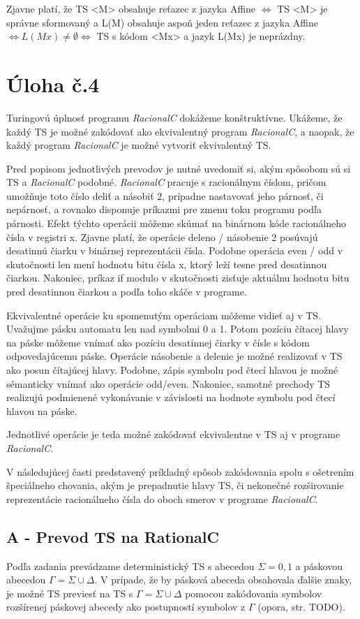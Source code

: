 \documentclass[10pt]{article}
\begin{document}
Zjavne platí, že TS <M> obsahuje reťazec z jazyka Affine $\iff$ TS <M> je správne sformovaný a L(M)
obsahuje aspoň jeden reťazec z jazyka Affine $\iff L(Mx) \neq \emptyset \iff$ TS s kódom <Mx> a
jazyk L(Mx) je neprázdny.

\section*{Úloha č.4}
Turingovú úplnosť programu \textit{RacionalC} dokážeme konštruktívne. Ukážeme, že každý TS je možné
zakódovať ako ekvivalentný program \textit{RacionalC}, a naopak, že každý program \textit{RacionalC}
je možné vytvoriť ekvivalentný TS.

Pred popisom jednotlivých prevodov je nutné uvedomiť si, akým spôsobom sú si TS a
\textit{RacionalC} podobné. \textit{RacionalC} pracuje s racionálnym číslom, pričom umožňuje toto číslo deliť a násobiť 2,
prípadne nastavovať jeho párnosť, či nepárnosť, a rovnako disponuje príkazmi pre zmenu toku programu
podľa párnosti. 
Efekt týchto operácii môžeme skúmať na binárnom kóde racionálneho čísla v registri x.
Zjavne platí, že operácie deleno / násobenie 2 posúvajú desatinnú čiarku v binárnej reprezentácii
čísla. Podobne operácia even / odd v skutočnosti len mení hodnotu bitu čísla x, ktorý leží tesne
pred desatinnou čiarkou. Nakoniec, príkaz if modulo v skutočnosti zisťuje aktuálnu hodnotu bitu
pred desatinnou čiarkou a podľa toho skáče v programe.

Ekvivalentné operácie ku spomenutým operáciam môžeme vidieť aj v TS. Uvažujme pásku automatu len nad
symbolmi 0 a 1. Potom pozíciu čítacej hlavy na páske
môžeme vnímať ako pozíciu desatinnej čiarky v čísle s kódom odpovedajúcemu páske.
Operácie násobenie a delenie je možné realizovať v TS ako posun čítajúcej hlavy.
Podobne, zápis symbolu pod čtecí hlavou je možné sémanticky vnímať ako operácie odd/even.
Nakoniec, samotné prechody TS realizujú podmienené vykonávanie v závislosti na hodnote symbolu pod
čtecí hlavou na páske.

Jednotlivé operácie je teda možné zakódovať ekvivalentne v TS aj v programe \textit{RacionalC}.

V následujúcej časti predstavený príkladný spôsob zakódovania spolu s ošetrením špeciálneho
chovania, akým je prepadnutie hlavy TS, či nekonečné rozširovanie reprezentácie racionálneho čísla
do oboch smerov v programe \textit{RacionalC}.

\subsection*{A - Prevod TS na RationalC}
Podľa zadania prevádzame deterministický TS s abecedou $\Sigma = {0,1}$ a páskovou abecedou 
$\Gamma = \Sigma \cup {\Delta}$. V prípade, že by pásková abeceda obsahovala ďalšie znaky, je možné 
TS previesť na TS s $\Gamma = \Sigma \cup {\Delta}$ pomocou zakódovania symbolov rozšírenej páskovej abecedy
ako postupností symbolov z $\Gamma$ (opora, str. TODO).
\end{document}
